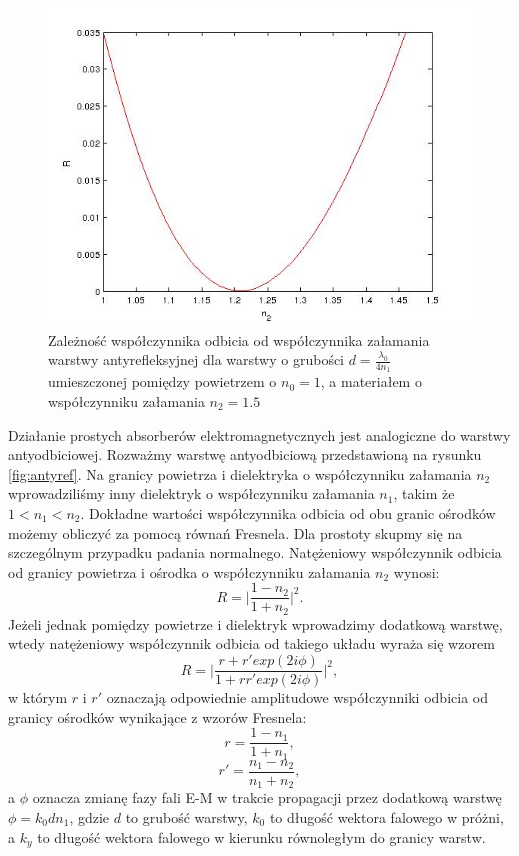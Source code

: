 \begin{figure}[tb]
	\centering
	\includegraphics[width=\textwidth]{images/antyref.jpg}
	\caption{Zależność współczynnika odbicia od współczynnika załamania warstwy antyrefleksyjnej dla warstwy o grubości $d=\frac{\lambda_0}{4 n_1}$ umieszczonej pomiędzy powietrzem o $n_0=1$, a materiałem o współczynniku załamania $n_2=1.5$}
	\label{fig:antyref-result}
\end{figure}


Działanie prostych absorberów elektromagnetycznych jest analogiczne do warstwy antyodbiciowej. Rozważmy   warstwę antyodbiciową przedstawioną na rysunku \ref{fig:antyref}. Na granicy powietrza i dielektryka o współczynniku załamania $n_2$ wprowadziliśmy inny dielektryk o współczynniku załamania $n_1$, takim że $1<n_1<n_2$. Dokładne wartości współczynnika odbicia od obu granic ośrodków możemy obliczyć za pomocą równań Fresnela. Dla prostoty skupmy się na szczególnym przypadku padania normalnego. Natężeniowy współczynnik odbicia od granicy powietrza i ośrodka o współczynniku załamania $n_2$ wynosi:
\begin{equation}
R=\bigg|\frac{1-n_2}{1+n_2}\bigg|^2.
\end{equation}
Jeżeli jednak pomiędzy powietrze i dielektryk wprowadzimy dodatkową warstwę, wtedy natężeniowy współczynnik odbicia od takiego układu wyraża się wzorem
\begin{equation}
R=\Bigg| \frac{r+r' exp(2 i\phi)}{1+r r' exp(2 i\phi)} \Bigg|^2,
\end{equation}
w którym $r$ i $r'$ oznaczają odpowiednie amplitudowe współczynniki odbicia od granicy ośrodków wynikające z wzorów Fresnela:
\begin{equation}
r=\frac{1-n_1}{1+n_1},
\end{equation}
\begin{equation}
r'=\frac{n_1-n_2}{n_1+n_2},
\end{equation}
a $\phi$ oznacza zmianę fazy fali E-M w trakcie propagacji przez dodatkową warstwę $\phi=k_0 d n_1$, gdzie $d$ to grubość warstwy, $k_0$ to długość wektora falowego w próżni, a $k_y$ to długość wektora falowego w kierunku równoległym do granicy warstw.


